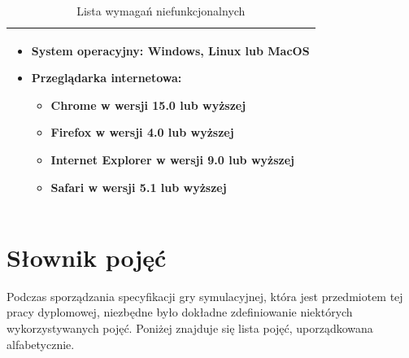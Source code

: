 \begin{table}
\begin{center}
\begin{tabular}{|p{}|}
\hline
	\begin{itemize}
		\setlength\itemsep{0pt}		
		\item System operacyjny: Windows, Linux lub MacOS
		\item Przeglądarka internetowa: 
			\begin{itemize}
				\item Chrome w wersji 15.0 lub wyższej
				\item Firefox w wersji 4.0 lub wyższej
				\item Internet Explorer w wersji 9.0 lub wyższej
				\item Safari w wersji 5.1 lub wyższej
			\end{itemize} 
	\end{itemize}
\\\hline
\end{tabular}
\caption {Lista wymagań niefunkcjonalnych\label{nonFunc}}
\end{center}
\end{table} 

\section{Słownik pojęć}\label{dictonary}
Podczas sporządzania specyfikacji gry symulacyjnej, która jest przedmiotem tej pracy dyplomowej, niezbędne było dokładne zdefiniowanie niektórych wykorzystywanych pojęć. Poniżej znajduje się lista pojęć, uporządkowana alfabetycznie.

